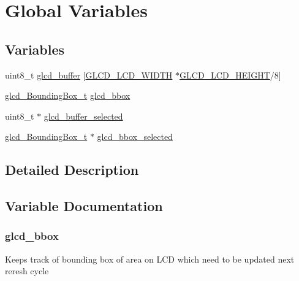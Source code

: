 \hypertarget{group___global_vars}{}\section{Global Variables}
\label{group___global_vars}
\subsection*{Variables}
\begin{DoxyCompactItemize}
\item 
uint8\+\_\+t \hyperlink{group___global_vars_ga889ec8484defa014e3d9f22f576c7083}{glcd\+\_\+buffer} \mbox{[}\hyperlink{glcd_8h_af98ee97c3e6460df86a694d31631e552}{G\+L\+C\+D\+\_\+\+L\+C\+D\+\_\+\+W\+I\+D\+T\+H} $\ast$\hyperlink{glcd_8h_a1345d21edd852dc1028efdd8035852b2}{G\+L\+C\+D\+\_\+\+L\+C\+D\+\_\+\+H\+E\+I\+G\+H\+T}/8\mbox{]}
\item 
\hyperlink{structglcd___bounding_box__t}{glcd\+\_\+\+Bounding\+Box\+\_\+t} \hyperlink{group___global_vars_gab7e1550f016f4251d15452cc4775d4e9}{glcd\+\_\+bbox}
\item 
uint8\+\_\+t $\ast$ \hyperlink{group___global_vars_ga8c28e20f1f4105bea86f28bf9db61059}{glcd\+\_\+buffer\+\_\+selected}
\item 
\hyperlink{structglcd___bounding_box__t}{glcd\+\_\+\+Bounding\+Box\+\_\+t} $\ast$ \hyperlink{group___global_vars_ga03b7bab8dce1a74310e1de15e1b7cb36}{glcd\+\_\+bbox\+\_\+selected}
\end{DoxyCompactItemize}


\subsection{Detailed Description}


\subsection{Variable Documentation}
\hypertarget{group___global_vars_gab7e1550f016f4251d15452cc4775d4e9}{}
\subsubsection[{glcd\+\_\+bbox}]{ glcd\+\_\+bbox}\label{group___global_vars_gab7e1550f016f4251d15452cc4775d4e9}
Keeps track of bounding box of area on L\+C\+D which need to be updated next reresh cycle 

